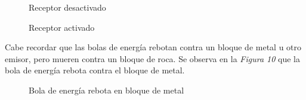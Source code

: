 \documentclass[a4paper]{article}
\begin{document}
\begin{figure}[!h]
	\caption{Receptor desactivado}
	\label{fig:diagrama9}
\end{figure}

\begin{figure}[!h]
	\caption{Receptor activado}
	\label{fig:diagrama10}
\end{figure}

Cabe recordar que las bolas de energía rebotan contra un bloque de metal u otro emisor, pero mueren contra un bloque de roca. Se observa en la \textit{Figura 10} que la bola de energía rebota contra el bloque de metal.

\begin{figure}[!h]
	\caption{Bola de energía rebota en bloque de metal}
	\label{fig:diagrama11}
\end{figure}
\end{document}
